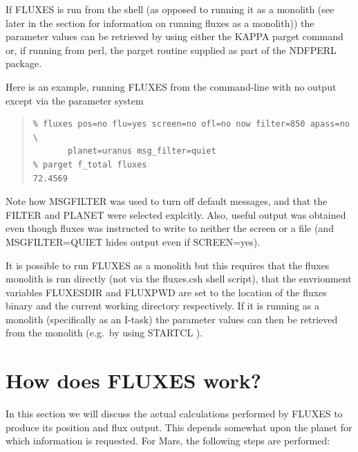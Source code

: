 \documentclass[11pt,twoside]{article}
\newenvironment{myquote}{\begin{quote}\begin{small}}{\end{small}\end{quote}}
\newcommand{\xref}[3]{#1}
\newcommand{\xlabel}[1]{}
\renewcommand{\_}{\texttt{\symbol{95}}}
\begin{document}
If FLUXES is run from the shell (as opposed to running it as a
monolith (see later in the section for information on running fluxes
as a monolith)) the parameter values can be retrieved by using either
the \xref{KAPPA}{sun95}{} \xref{parget}{sun95}{PARGET} command
or, if running from perl, the par\_get routine supplied as part of the
\xref{NDFPERL}{sun222}{} package.

Here is an example, running FLUXES from the command-line with
no output except via the parameter system

\begin{myquote}
\begin{verbatim}
% fluxes pos=no flu=yes screen=no ofl=no now filter=850 apass=no \
       planet=uranus msg_filter=quiet
% parget f_total fluxes
72.4569
\end{verbatim}
\end{myquote}

Note how MSG\_FILTER was used to turn off default messages, and
that the FILTER and PLANET were selected explcitly. Also, useful
output was obtained even though fluxes was instructed to write
to neither the screen or a file (and MSG\_FILTER=QUIET hides
output even if SCREEN=yes).


It is possible to run FLUXES as a monolith but this requires
that the fluxes monolith is run directly (not via the fluxes.csh
shell script), that the envrionment variables
FLUXES\_DIR and FLUXPWD are set to the location of the fluxes binary
and the current working directory respectively. If it is running
as a monolith (specifically as an I-task) the parameter values can
then be retrieved from the monolith (e.g.\ by using
\xref{STARTCL}{sun186}{adam_message_system_extension} ).

\section{How does FLUXES work?}
\xlabel{howfluxesworks}
\label{sec:howfluxesworks}

In this section we will discuss the actual calculations performed by FLUXES to produce its position and flux output.  This depends somewhat upon the planet for which information is requested.  For Mars, the following steps are performed:
\end{document}
